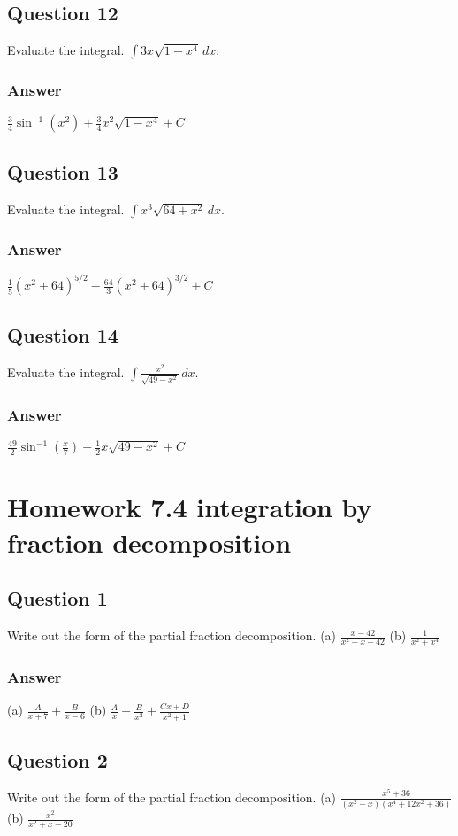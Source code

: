 \documentclass{article}
\begin{document}
\subsection*{Question 12}
Evaluate the integral. $\int 3x\sqrt{1-x^4} \,dx$.
\subsubsection*{Answer}
$ \frac{3}{4}\sin^{-1}(x^2) + \frac{3}{4}x^2\sqrt{1-x^4} + C $

\subsection*{Question 13}
Evaluate the integral. $\int x^3\sqrt{64+x^2} \,dx$.
\subsubsection*{Answer}
$ \frac{1}{5}(x^2+64)^{5/2} - \frac{64}{3}(x^2+64)^{3/2} + C $

\subsection*{Question 14}
Evaluate the integral. $\int \frac{x^2}{\sqrt{49-x^2}} \,dx$.
\subsubsection*{Answer}
$ \frac{49}{2}\sin^{-1}(\frac{x}{7}) - \frac{1}{2}x\sqrt{49-x^2} + C $

\newpage
\section{Homework 7.4 integration by fraction decomposition}

\subsection*{Question 1}
Write out the form of the partial fraction decomposition.
(a) $\frac{x-42}{x^2+x-42}$
(b) $\frac{1}{x^2+x^4}$
\subsubsection*{Answer}
(a) $\frac{A}{x+7} + \frac{B}{x-6}$
(b) $\frac{A}{x} + \frac{B}{x^2} + \frac{Cx+D}{x^2+1}$

\subsection*{Question 2}
Write out the form of the partial fraction decomposition.
(a) $\frac{x^5+36}{(x^2-x)(x^4+12x^2+36)}$
(b) $\frac{x^2}{x^2+x-20}$
\end{document}
